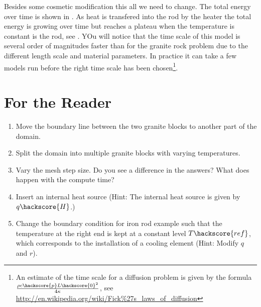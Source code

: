 Besides some cosmetic modification this all we need to change. The total energy over time is shown in . As heat
is transfered into the rod by the heater the total energy is growing over time but reaches a plateau 
when the temperature is constant is the rod, see . 
YOu will notice that the time scale of this model is several order of magnitudes faster than
for the granite rock problem due to the different length scale and material parameters. 
In practice it can take a few models run before the right time scale has been chosen\footnote{An estimate of the
time scale for a diffusion problem is given by the formula $\frac{\rho c\hackscore{p} L\hackscore{0}^2}{4 \kappa}$, see
\url{http://en.wikipedia.org/wiki/Fick\%27s_laws_of_diffusion}}.






\section{For the Reader}
\begin{enumerate}
 \item Move the boundary line between the two granite blocks to another part of the domain.
 \item Split the domain into multiple granite blocks with varying temperatures.
 \item Vary the mesh step size. Do you see a difference in the answers? What does happen with the compute time?
 \item Insert an internal heat source (Hint: The internal heat source is given by $q\hackscore{H}$.)
 \item Change the boundary condition for iron rod example such that the temperature 
 at the right end is kept at a constant level $T\hackscore{ref}$, which corresponds to the installation of a cooling element (Hint: Modify $q$ and $r$). 
\end{enumerate}

